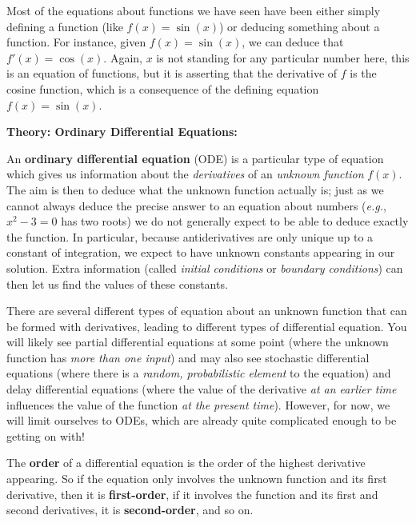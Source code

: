\documentclass{article}
\begin{document}
Most of the equations about functions we have seen have been either simply defining a function (like $f(x)=\sin(x)$) or deducing something about a function. For instance, given $f(x)=\sin(x)$, we can deduce that $f'(x)=\cos(x)$. Again, $x$ is not standing for any particular number here, this is an equation of functions, but it is asserting that the derivative of $f$ is the cosine function, which is a consequence of the defining equation $f(x)=\sin(x)$.


\clearpage








\textbf{Theory: Ordinary Differential Equations:}\bigskip


An \textbf{ordinary differential equation} (ODE) is a particular type of equation which gives us information about the \textit{derivatives} of an \textit{unknown function} $f(x)$. The aim is then to deduce what the unknown function actually is; just as we cannot always deduce the precise answer to an equation about numbers (\textit{e.g.}, $x^2-3=0$ has two roots) we do not generally expect to be able to deduce exactly the function. In particular, because antiderivatives are only unique up to a constant of integration, we expect to have unknown constants appearing in our solution. Extra information (called \textit{initial conditions} or \textit{boundary conditions}) can then let us find the values of these constants.

There are several different types of equation about an unknown function that can be formed with derivatives, leading to different types of differential equation. You will likely see partial differential equations at some point (where the unknown function has \textit{more than one input}) and may also see stochastic differential equations (where there is a \textit{random, probabilistic element} to the equation) and delay differential equations (where the value of the derivative \textit{at an earlier time} influences the value of the function \textit{at the present time}). However, for now, we will limit ourselves to ODEs, which are already quite complicated enough to be getting on with!


The \textbf{order} of a differential equation is the order of the highest derivative appearing. So if the equation only involves the unknown function and its first derivative, then it is \textbf{first-order}, if it involves the function and its first and second derivatives, it is \textbf{second-order}, and so on.\medskip
\end{document}
